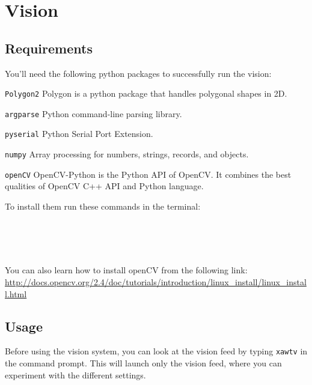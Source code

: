 \section{Vision}

\subsection{Requirements}
You'll need the following python packages to successfully run the vision:

\begin{description}
\item \texttt{Polygon2} Polygon is a python package that handles polygonal shapes in 2D. 
\item \texttt{argparse} Python command-line parsing library.
\item \texttt{pyserial} Python Serial Port Extension.
\item \texttt{numpy} Array processing for numbers, strings, records, and objects.
\item \texttt{openCV} OpenCV-Python is the Python API of OpenCV. It combines the best qualities of OpenCV C++ API and Python language.
\end{description}

To install them run these commands in the terminal:

 \\
 \\
 \\

You can also learn how to install openCV from the following link:
\url{http://docs.opencv.org/2.4/doc/tutorials/introduction/linux_install/linux_install.html}

\subsection{Usage}
Before using the vision system, you can look at the vision feed by typing \texttt{xawtv} in the command prompt. This will launch only the vision feed, where you can experiment with the different settings.

